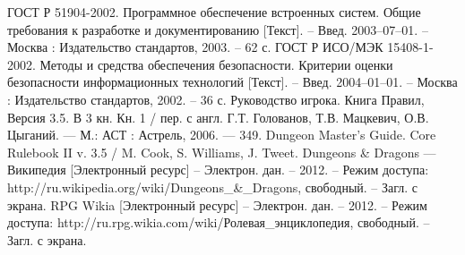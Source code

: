 \begin{thebibliography}{@@@@}
   ГОСТ Р 51904-2002. Программное обеспечение встроенных систем. Общие требования к разработке и документированию [Текст]. – Введ. 2003–07–01. – Москва : Издательство стандартов, 2003. – 62 с. 
   ГОСТ Р ИСО/МЭК 15408-1-2002. Методы и средства обеспечения безопасности. Критерии оценки безопасности информационных технологий [Текст]. – Введ. 2004–01–01. – Москва : Издательство стандартов, 2002. – 36 с.
   Руководство игрока. Книга Правил, Версия 3.5. В 3 кн. Кн. 1 / пер. с англ. Г.Т. Голованов, Т.В. Мацкевич, О.В. Цыганий. — М.: АСТ : Астрель, 2006. — 349.
   Dungeon Master's Guide. Core Rulebook II v. 3.5 / M. Cook, S. Williams, J. Tweet.
   Dungeons \& Dragons — Википедия [Электронный ресурс] – Электрон. дан. – 2012. – Режим доступа: http://ru.wikipedia.org/wiki/Dungeons\_\&\_Dragons, свободный. – Загл. с экрана.
   RPG Wikia [Электронный ресурс] – Электрон. дан. – 2012. – Режим доступа: http://ru.rpg.wikia.com/wiki/Ролевая\_энциклопедия, свободный. – Загл. с экрана.
\end{thebibliography}
